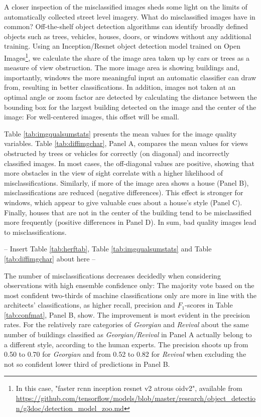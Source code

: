 \documentclass[]{article}
\let\rmarkdownfootnote\footnote%
\def\footnote{\protect\rmarkdownfootnote}
\begin{document}
A closer inspection of the misclassified images sheds some light on the
limits of automatically collected street level imagery. What do
misclassified images have in common? Off-the-shelf object detection
algorithms can identify broadly defined objects such as trees, vehicles,
houses, doors, or windows without any additional training. Using an
Inception/Resnet object detection model trained on Open
Images\footnote{In this case, "faster rcnn inception resnet v2 atrous oidv2", available from \url{https://github.com/tensorflow/models/blob/master/research/object_detection/g3doc/detection_model_zoo.md}},
we calculate the share of the image area taken up by cars or trees as a
measure of view obstruction. The more image area is showing buildings
and, importantly, windows the more meaningful input an automatic
classifier can draw from, resulting in better classifications. In
addition, images not taken at an optimal angle or zoom factor are
detected by calculating the distance between the bounding box for the
largest building detected on the image and the center of the image: For
well-centered images, this offset will be small.

Table \ref{tab:imgqualsumstats} presents the mean values for the image
quality variables. Table \ref{tab:diffimgchar}, Panel A, compares the
mean values for views obstructed by trees or vehicles for correctly (on
diagonal) and incorrectly classified images. In most cases, the
off-diagonal values are positive, showing that more obstacles in the
view of sight correlate with a higher likelihood of misclassifications.
Similarly, if more of the image area shows a house (Panel B),
misclassifications are reduced (negative differences). This effect is
stronger for windows, which appear to give valuable cues about a house's
style (Panel C). Finally, houses that are not in the center of the
building tend to be misclassified more frequently (positive differences
in Panel D). In sum, bad quality images lead to misclassifications.

\begin{center}
  -- Insert Table \ref{tab:herftab}, Table \ref{tab:imgqualsumstats} and Table \ref{tab:diffimgchar} about here --
\end{center}

The number of misclassifications decreases decidedly when considering
observations with high ensemble confidence only: The majority vote based
on the most confident two-thirds of machine classifications only are
more in line with the architects' classifications, as higher recall,
precision and \(F_1\)-scores in Table \ref{tab:confmat}, Panel B, show.
The improvement is most evident in the precision rates. For the
relatively rare categories of \emph{Georgian} and \emph{Revival} about
the same number of buildings classified as \emph{Georgian/Revival} in
Panel A actually belong to a different style, according to the human
experts. The precision shoots up from 0.50 to 0.70 for \emph{Georgian}
and from 0.52 to 0.82 for \emph{Revival} when excluding the not so
confident lower third of predictions in Panel B.
\end{document}
